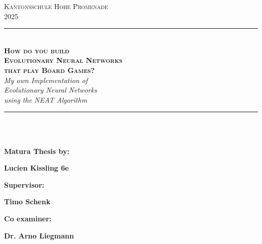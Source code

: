\documentclass[11pt, a4paper, notitlepage]{report}
\begin{document}
    \begin{titelpage}
        \BgThispage
            \color{white} {
                \begin{center}
                    \Large \textsc{Kantonsschule Hohe Promenade\\2025}\\
                    \rule[0.1cm]{15.8cm}{0.1mm}\\
                    \vspace{3cm}
                    \Huge \textbf{ \textsc{How do you build \\Evolutionary Neural Networks \\that play Board Games?}}\\
                    \vspace{0.8cm}
                    \Large \textit {My own Implementation of \\Evolutionary Neural Networks \\using the NEAT Algorithm}\\
                \end{center}
                \vspace{3cm}
                \rule[0.1cm]{15.8cm}{0.1mm}\\
                \vspace{7cm}\\
                \begin{minipage}[t]{0.47\textwidth}
                \large\textbf {Matura Thesis by:}\\
                \end{minipage}
                \hfill
                \begin{minipage}[t]{0.47\textwidth}\raggedleft
                \large\textbf {Lucien Kissling 6e}\\
                \end{minipage}
                \begin{minipage}[t]{0.47\textwidth}
                \large \textbf {Supervisor:}\\
                \end{minipage}
                \hfill
                \begin{minipage}[t]{0.47\textwidth}\raggedleft
                \large \textbf {Timo Schenk}\\
                \end{minipage}
                \begin{minipage}[t]{0.47\textwidth}
                \large \textbf {Co examiner:}\\
                \end{minipage}
                \hfill
                \begin{minipage}[t]{0.47\textwidth}\raggedleft
                \large \textbf {Dr. Arno Liegmann}\\
                \end{minipage}
                \vfill
            }
        \clearpage
    \end{titelpage}
    \tableofcontents
\end{document}
